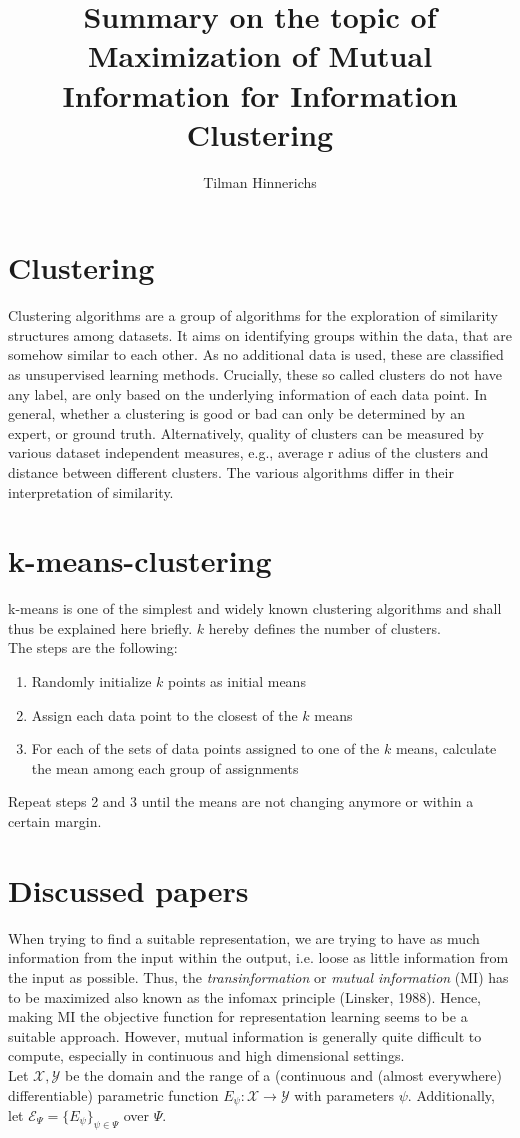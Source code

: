 \documentclass[]{article}
\title{Summary on the topic of Maximization of Mutual Information for Information Clustering}
\author{Tilman Hinnerichs}
\begin{document}
\maketitle
\section{Clustering}
Clustering algorithms are a group of algorithms for the exploration of similarity structures among datasets. It aims on identifying groups within the data, that are somehow similar to each other. As no additional data is used, these are classified as unsupervised learning methods. Crucially, these so called clusters do not have any label, are only based on the underlying information of each data point. In general, whether a clustering is good or bad can only be determined by an expert, or ground truth. Alternatively, quality of clusters can be measured by various dataset independent measures, e.g., average r adius of the clusters and distance between different clusters. The various algorithms differ in their interpretation of similarity. \\
\section{k-means-clustering}
k-means is one of the simplest and widely known clustering algorithms and shall thus be explained here briefly. $k$ hereby defines the number of clusters.\\
The steps are the following:
\begin{enumerate}
	\item Randomly initialize $k$ points as initial means 
	\item Assign each data point to the closest of the $k$ means
	\item For each of the sets of data points assigned to one of the $k$ means, calculate the mean among each group of assignments
\end{enumerate}
Repeat steps 2 and 3 until the means are not changing anymore or within a certain margin.

\section{Discussed papers}
When trying to find a suitable representation, we are trying to have as much information from the input within the output, i.e. loose as little information from the input as possible. Thus, the \textit{transinformation} or \textit{mutual information} (MI) has to be maximized also known as the infomax principle (Linsker, 1988). Hence, making MI the objective function for representation learning seems to be a suitable approach. However,  mutual information is generally quite difficult to compute, especially in continuous and high dimensional settings.\\
Let $\mathcal{X}, \mathcal{Y}$ be the domain and the range of a (continuous and (almost everywhere) differentiable) parametric function
$E_\psi:\mathcal{X}\rightarrow\mathcal{Y}$ with parameters $\psi$. Additionally, let $\mathcal{E}_\Psi=\{E_\psi\}_{\psi\in\Psi}$ over $\Psi$. \\
\end{document}
